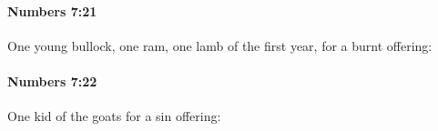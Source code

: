 		\paragraph{Numbers 7:21} %
			\label{NUMBERS-7-21}

			One young bullock, one ram, one lamb of the first year, for a burnt offering:


		\paragraph{Numbers 7:22} %
			\label{NUMBERS-7-22}

			One kid of the goats for a sin offering:


